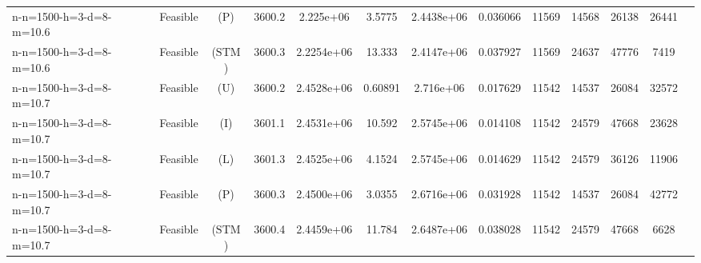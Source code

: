 \documentclass[landscape, a4paper]{article}
\newcommand{\STM}{\ensuremath{\mathrm{STM}}}
\newcommand{\Improved}{\ensuremath{\mathrm{I}}}
\newcommand{\Loose}{\ensuremath{\mathrm{L}}}
\newcommand{\Profit}{\ensuremath{\mathrm{P}}}
\newcommand{\Utility}{\ensuremath{\mathrm{U}}}
\begin{document}
\begin{center}
\begin{tabular}{lcccccccccccc}
n-n=1500-h=3-d=8-m=10.6 & Feasible & (\Profit) & 3600.2 & 2.225e+06 & 3.5775 & 2.4438e+06 & 0.036066 & 11569 & 14568 & 26138 & 26441 & \\
n-n=1500-h=3-d=8-m=10.6 & Feasible & (\STM) & 3600.3 & 2.2254e+06 & 13.333 & 2.4147e+06 & 0.037927 & 11569 & 24637 & 47776 & 7419 & \\
n-n=1500-h=3-d=8-m=10.7 & Feasible & (\Utility) & 3600.2 & 2.4528e+06 & 0.60891 & 2.716e+06 & 0.017629 & 11542 & 14537 & 26084 & 32572 & \\
n-n=1500-h=3-d=8-m=10.7 & Feasible & (\Improved) & 3601.1 & 2.4531e+06 & 10.592 & 2.5745e+06 & 0.014108 & 11542 & 24579 & 47668 & 23628 & \\
n-n=1500-h=3-d=8-m=10.7 & Feasible & (\Loose) & 3601.3 & 2.4525e+06 & 4.1524 & 2.5745e+06 & 0.014629 & 11542 & 24579 & 36126 & 11906 & \\
n-n=1500-h=3-d=8-m=10.7 & Feasible & (\Profit) & 3600.3 & 2.4500e+06 & 3.0355 & 2.6716e+06 & 0.031928 & 11542 & 14537 & 26084 & 42772 & \\
n-n=1500-h=3-d=8-m=10.7 & Feasible & (\STM) & 3600.4 & 2.4459e+06 & 11.784 & 2.6487e+06 & 0.038028 & 11542 & 24579 & 47668 & 6628 & \\
\end{tabular}
\end{center}
\end{document}
